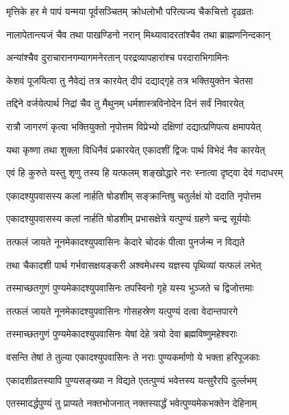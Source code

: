 \twolineshloka
{मृत्तिके हर मे पापं यन्मया पूर्वसञ्चितम्}
{क्रोधलोभौ परित्यज्य चैकचित्तो दृढव्रतः}%

\twolineshloka
{नालापेतान्त्यजं चैव तथा पाखण्डिनो नरान्}
{मिथ्यावादरतांश्चैव तथा ब्राह्मणनिन्दकान्}%

\twolineshloka
{अन्यांश्चैव दुराचारानगम्यागमनेरतान्}
{परद्रव्यापहारांश्च परदाराभिगामिनः}%

\twolineshloka
{केशवं पूजयित्वा तु नैवेद्यं तत्र कारयेत्}
{दीपं दद्याद्गृहे तत्र भक्तियुक्तेन चेतसा}%

\twolineshloka
{तद्दिने वर्जयेत्पार्थ निद्रां चैव तु मैथुनम्}
{धर्मशास्त्रविनोदेन दिनं सर्वं निवारयेत्}%

\twolineshloka
{रात्रौ जागरणं कृत्वा भक्तियुक्तो नृपोत्तम}
{विप्रेभ्यो दक्षिणां दद्यात्प्रणिपत्य क्षमापयेत्}%

\twolineshloka
{यथा कृष्णा तथा शुक्ला विधिनैवं प्रकारयेत्}
{एकादशीं द्विजः पार्थ विभेदं नैव कारयेत्}%

\twolineshloka
{एवं हि कुरुते यस्तु शृणु तस्य हि यत्फलम्}
{शङ्खोद्धारे नरः स्नात्वा दृष्ट्वा देवं गदाधरम्}%

\twolineshloka
{एकादश्युपवासस्य कलां नार्हति षोडशीम्}
{सङ्क्रान्तिषु चतुर्लक्षं यो ददाति नृपोत्तम}%

\twolineshloka
{एकादश्युपवासस्य कलां नार्हति षोडशीम्}
{प्रभासक्षेत्रे यत्पुण्यं ग्रहणे चन्द्र सूर्ययोः}%

\twolineshloka
{तत्फलं जायते नूनमेकादश्युपवासिनः}
{केदारे चोदकं पीत्वा पुनर्जन्म न विद्यते}%

\twolineshloka
{तथा चैकादशी पार्थ गर्भवासक्षयङ्करी}
{अश्वमेधस्य यज्ञस्य पृथिव्यां यत्फलं लभेत्}%

\twolineshloka
{तस्माच्छतगुणं पुण्यमेकादश्युपवासिनः}
{तपस्विनो गृहे यस्य भुञ्जते च द्विजोत्तमाः}%

\twolineshloka
{तत्फलं जायते नूनमेकादश्युपवासिनः}
{गोसहस्रेण यत्पुण्यं दत्वा वेदान्तपारगे}%

\twolineshloka
{तस्माच्छतगुणं पुण्यमेकादश्युपवासिनः}
{येषां देहे त्रयो देवा ब्रह्मविष्णुमहेश्वराः}%

\twolineshloka
{वसन्ति तेषां ते तुल्या एकादश्युपवासिनः}
{ते नराः पुण्यकर्माणो ये भक्ता हरिपूजकाः}%

\twolineshloka
{एकादशीव्रतस्यापि पुण्यसङ्ख्या न विद्यते}
{एतत्पुण्यं भवेत्तस्य यत्सुरैरपि दुर्ल्लभम्}%

\twolineshloka
{एतस्मादर्द्धपुण्यं तु प्राप्यते नक्तभोजनात्}
{नक्तस्यार्द्धं भवेत्पुण्यमेकभक्तेन देहिनाम्}%


